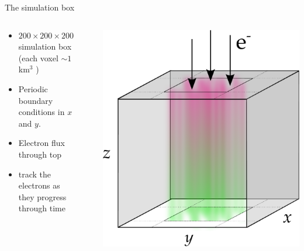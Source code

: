 \documentclass[xcolor=pdftex,dvipsnames,table,usenames,11pt]{beamer}
\begin{document}
\begin{frame}{The simulation box}
\begin{columns}[onlytextwidth]
  \begin{column}{0.5\textwidth}
    \begin{itemize}
    \item $200\times 200\times 200$ simulation box (each voxel $\sim 1$ km$^3$ )
    \item Periodic boundary conditions in $x$ and $y$.
    \item Electron flux through top
    \item track the electrons as they progress through time
    \end{itemize}
  \end{column}
  \begin{column}{0.05\textwidth}
  \end{column}
  \begin{column}{0.45\textwidth}
    \includegraphics[width=\textwidth]{img/simulation_cell.pdf}
  \end{column}
\end{columns}
\end{frame}
\end{document}
